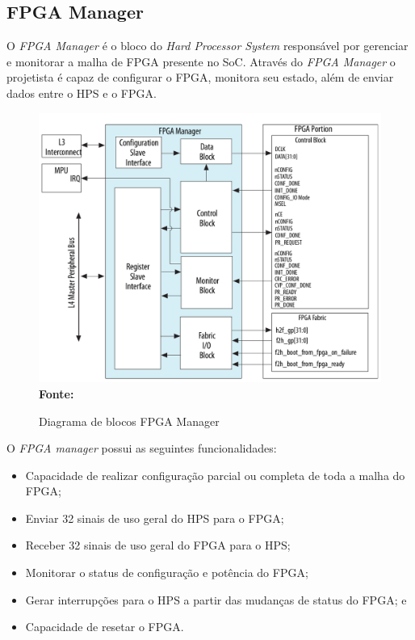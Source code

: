 \subsection{FPGA Manager}
O \textit{FPGA Manager} é o bloco do \textit{Hard Processor System} responsável por gerenciar e monitorar a malha de FPGA presente no SoC. Através do \textit{FPGA Manager} o projetista é capaz de configurar o FPGA, monitora seu estado, além de enviar dados entre o HPS e o FPGA\@. 

\begin{figure}[ht]
	\caption{Diagrama de blocos FPGA Manager }
	\begin{center}
		\includegraphics[scale=0.3]{imagens/fpgamanager.png}\\
		{\small \textbf{Fonte:} }
    \end{center}\label{fig:fpgamanager}
\end{figure}

O \textit{FPGA manager} possui as seguintes funcionalidades:

\begin{itemize}
    \item Capacidade de realizar configuração parcial ou completa de toda a malha do FPGA\@;
    \item Enviar 32 sinais de uso geral  do HPS para o FPGA\@;
    \item Receber 32 sinais de uso geral do FPGA para o HPS\@;
    \item Monitorar o status de configuração e potência do FPGA\@;
    \item Gerar interrupções para o HPS a partir das mudanças de status do FPGA\@; e
    \item Capacidade de resetar o FPGA\@.
\end{itemize}

